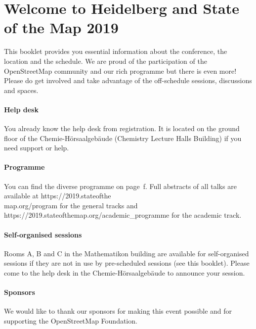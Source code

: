 \newpage
\enlargethispage{1\baselineskip}
\section*{Welcome to Heidelberg and State of the Map 2019} \label{welcome}
This booklet provides you essential information
about the conference, the location and the schedule.  We are proud of the participation of the
OpenStreetMap community and our rich programme but there is even more!  Please do get involved and
take advantage of the off-schedule sessions, discussions and spaces.

\paragraph*{Help desk} \label{welcome-helpdesk}
You already know the help desk from registration. It is located on the ground floor of the Chemie-Hörsaalgebäude (Chemistry
Lecture Halls Building) if you need support or help.

\paragraph*{Programme}
You can find the diverse programme on page~\pageref{saturday}f. Full abstracts of all talks are
available at https://2019.stateofthe\\map.org/program for the general tracks and
https://2019.stateofthemap.org/academic\_programme for the academic track.

\paragraph*{Self-organised sessions} \label{welcome-location}
Rooms A, B and C in the Mathematikon building are available for self-organised sessions if they are not in use by pre-scheduled sessions (see this booklet). Please come to the help desk in the Chemie-Hörsaalgebäude to announce your session.

\paragraph*{Sponsors} \label{welcome-sponsors}
We would like to thank our sponsors for making this event possible and for supporting the 
OpenStreetMap Foundation.
\newpage
